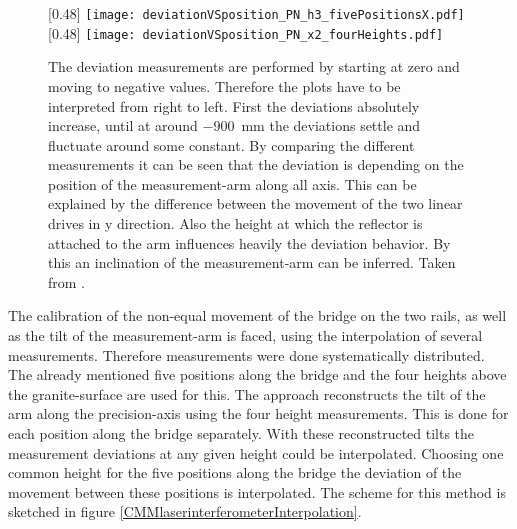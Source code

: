 \documentclass[
twoside,            %
BCOR1.4cm,          %
10pt,               %
headings=normal,    %
headsepline,        %
clearplainpage,		%
final,              %
div=14,
open=right,
bibliography=toc
]{scrreprt}
\begin{document}
\begin{figure}[!h]
	\centering
	[0.48\textwidth]
	{\texttt{[image: deviationVSposition\_PN\_h3\_fivePositionsX.pdf]}}
	\hfill
	[0.48\textwidth]
	{\texttt{[image: deviationVSposition\_PN\_x2\_fourHeights.pdf]}}
	\vspace{-2mm}
	\caption{
		The deviation measurements are performed by starting at zero and moving to negative values.
		Therefore the plots have to be interpreted from right to left.
		First the deviations absolutely increase, until at around \SI{-900}{mm} the deviations settle and fluctuate around some constant.
		By comparing the different measurements it can be seen that the deviation is depending on the position of the measurement-arm along all axis.
		This can be explained by the difference between the movement of the two linear drives in y direction.
		Also the height at which the reflector is attached to the arm influences heavily the deviation behavior.
		By this an inclination of the measurement-arm can be inferred.
		Taken from \cite{neubertThesis}.
	}
	\label{deviationVSposition}
\end{figure}

The calibration of the non-equal movement of the bridge on the two rails, as well as the tilt of the measurement-arm is faced, using the interpolation of several measurements.
Therefore measurements were done systematically distributed.
The already mentioned five positions along the bridge and the four heights above the granite-surface are used for this.
The approach reconstructs the tilt of the arm along the precision-axis using the four height measurements.
This is done for each position along the bridge separately.
With these reconstructed tilts the measurement deviations at any given height could be interpolated.
Choosing one common height for the five positions along the bridge the deviation of the movement between these positions is interpolated.
The scheme for this method is sketched in figure \ref{CMMlaserinterferometerInterpolation}.
\end{document}
